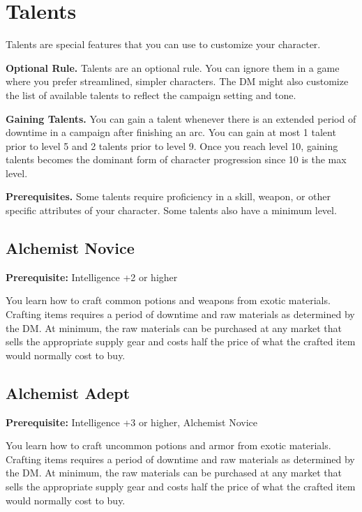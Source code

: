 \documentclass[12pt,letterpaper,twocolumn,openany,nodeprecatedcode,bg=none]{dndbook}
\let\oldsubsection\subsection
\renewcommand{\subsection}[1]{%
  \needspace{5\baselineskip}%
  \oldsubsection{#1}%
}
\begin{document}
\pagebreak

\section{Talents}\label{talents}

Talents are special features that you can use to customize your
character.

\textbf{Optional Rule.} Talents are an optional rule. You can ignore
them in a game where you prefer streamlined, simpler characters. The DM
might also customize the list of available talents to reflect the
campaign setting and tone.

\textbf{Gaining Talents.} You can gain a talent whenever there is an
extended period of downtime in a campaign after finishing an arc. You
can gain at most 1 talent prior to level 5 and 2 talents prior to level
9. Once you reach level 10, gaining talents becomes the dominant form of
character progression since 10 is the max level.

\textbf{Prerequisites.} Some talents require proficiency in a skill,
weapon, or other specific attributes of your character. Some talents
also have a minimum level.

\subsection{Alchemist Novice}\label{alchemist-novice}

\textbf{Prerequisite:} Intelligence +2 or higher

You learn how to craft common potions and weapons from exotic materials.
Crafting items requires a period of downtime and raw materials as
determined by the DM. At minimum, the raw materials can be purchased at
any market that sells the appropriate supply gear and costs half the
price of what the crafted item would normally cost to buy.

\subsection{Alchemist Adept}\label{alchemist-adept}

\textbf{Prerequisite:} Intelligence +3 or higher, Alchemist Novice

You learn how to craft uncommon potions and armor from exotic materials.
Crafting items requires a period of downtime and raw materials as
determined by the DM. At minimum, the raw materials can be purchased at
any market that sells the appropriate supply gear and costs half the
price of what the crafted item would normally cost to buy.
\end{document}
